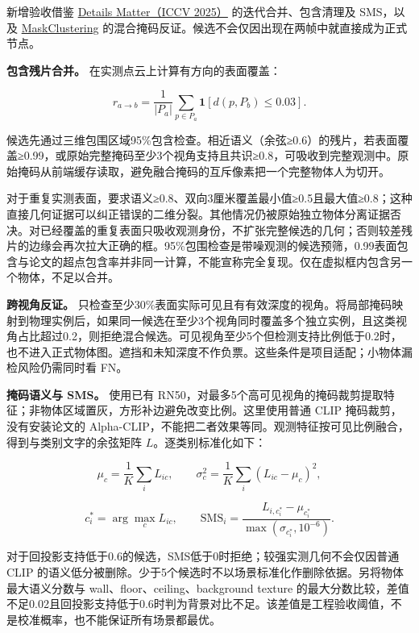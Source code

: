 \documentclass[UTF8,fontset=fandol]{ctexart}
\begin{document}
新增验收借鉴 \href{https://arxiv.org/abs/2507.23134}{Details Matter（ICCV 2025）} 的迭代合并、包含清理及 SMS，以及 \href{https://arxiv.org/abs/2401.07745}{MaskClustering} 的混合掩码反证。候选不会仅因出现在两帧中就直接成为正式节点。



\textbf{包含残片合并。} 在实测点云上计算有方向的表面覆盖：



\[
r_{a\to b}=\frac{1}{|P_a|}\sum_{p\in P_a}\mathbf1[d(p,P_b)\le0.03].
\]

候选先通过三维包围区域95\%包含检查。相近语义（余弦≥0.6）的残片，若表面覆盖≥0.99，或原始完整掩码至少3个视角支持且共识≥0.8，可吸收到完整观测中。原始掩码从前端缓存读取，避免融合掩码的互斥像素把一个完整物体人为切开。



对于重复实测表面，要求语义≥0.8、双向3厘米覆盖最小值≥0.5且最大值≥0.8；这种直接几何证据可以纠正错误的二维分裂。其他情况仍被原始独立物体分离证据否决。对已经覆盖的重复表面只吸收观测身份，不扩张完整候选的几何；否则较差残片的边缘会再次拉大正确的框。95\%包围检查是带噪观测的候选预筛，0.99表面包含与论文的超点包含率并非同一计算，不能宣称完全复现。仅在虚拟框内包含另一个物体，不足以合并。



\textbf{跨视角反证。} 只检查至少30\%表面实际可见且有有效深度的视角。将局部掩码映射到物理实例后，如果同一候选在至少3个视角同时覆盖多个独立实例，且这类视角占比超过0.2，则拒绝混合候选。可见视角至少5个但检测支持比例低于0.2时，也不进入正式物体图。遮挡和未知深度不作负票。这些条件是项目适配；小物体漏检风险仍需同时看 FN。



\textbf{掩码语义与 SMS。} 使用已有 RN50，对最多5个高可见视角的掩码裁剪提取特征；非物体区域置灰，方形补边避免改变比例。这里使用普通 CLIP 掩码裁剪，没有安装论文的 Alpha-CLIP，不能把二者效果等同。观测特征按可见比例融合，得到与类别文字的余弦矩阵 $L$。逐类别标准化如下：



\[
\mu_c=\frac1K\sum_iL_{ic},\qquad
\sigma_c^2=\frac1K\sum_i(L_{ic}-\mu_c)^2,
\]

\[
c_i^*=\arg\max_cL_{ic},\qquad
\mathrm{SMS}_i=\frac{L_{i,c_i^*}-\mu_{c_i^*}}{\max(\sigma_{c_i^*},10^{-6})}.
\]

对于回投影支持低于0.6的候选，SMS低于0时拒绝；较强实测几何不会仅因普通 CLIP 的语义低分被删除。少于5个候选时不以场景标准化作删除依据。另将物体最大语义分数与 wall、floor、ceiling、background texture 的最大分数比较，差值不足0.02且回投影支持低于0.6时判为背景对比不足。该差值是工程验收阈值，不是校准概率，也不能保证所有场景都最优。
\end{document}
